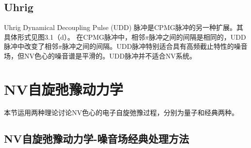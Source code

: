 \subsection{Uhrig}
Uhrig Dynamical Decoupling Pulse (UDD) 脉冲是CPMG脉冲的另一种扩展。其具体形式见图3.1（d）。 在CPMG脉冲中，相邻$\pi$脉冲之间的间隔是相同的，UDD脉冲中改变了相邻$\pi$脉冲之间的间隔。UDD脉冲特别适合具有高频截止特性的噪音场，但NV色心的噪音谱是平滑的。UDD脉冲并不适合NV系统。

\section{NV自旋弛豫动力学}
本节运用两种理论讨论NV色心的电子自旋弛豫过程，分别为量子和经典两种。
\subsection{NV自旋弛豫动力学-噪音场经典处理方法}

